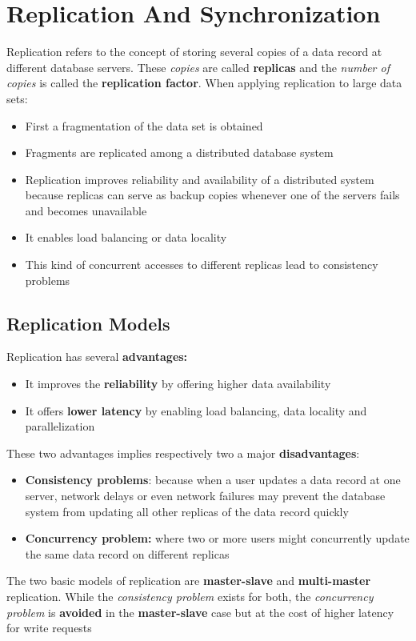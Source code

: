 \chapter{Replication And Synchronization}
Replication refers to the concept of storing several copies of a data record at different database servers. These \textit{copies} are called \textbf{replicas} and the \textit{number of copies} is called the \textbf{replication factor}. 
When applying replication to large data sets:
\begin{itemize}
    \item First a fragmentation of the data set is obtained
    \item Fragments are replicated among a distributed database system
    \item Replication improves reliability and availability of a distributed system because replicas can serve as backup copies whenever one of the servers fails and becomes unavailable
    \item It enables load balancing or data locality
    \item This kind of concurrent accesses to different replicas lead to consistency problems
\end{itemize}

\section{Replication Models}
Replication has several \textbf{advantages:}
\begin{itemize}
    \item It improves the \textbf{reliability} by offering higher data availability
    \item It offers \textbf{lower latency} by enabling load balancing, data locality and parallelization
\end{itemize}
These two advantages implies respectively two a major \textbf{disadvantages}:
\begin{itemize}
    \item \textbf{Consistency problems}: because when a user updates a data record at one server, network delays or even network failures may prevent the database system from updating all other replicas of the data record quickly
    \item \textbf{Concurrency problem:} where two or more users might concurrently update the same data record on different replicas
\end{itemize}

\begin{tcolorbox}
The two basic models of replication are \textbf{master-slave} and \textbf{multi-master} replication. While the \textit{consistency problem} exists for both, the \textit{concurrency problem} is \textbf{avoided} in the \textbf{master-slave} case but at the cost of higher latency for write requests
\end{tcolorbox}

